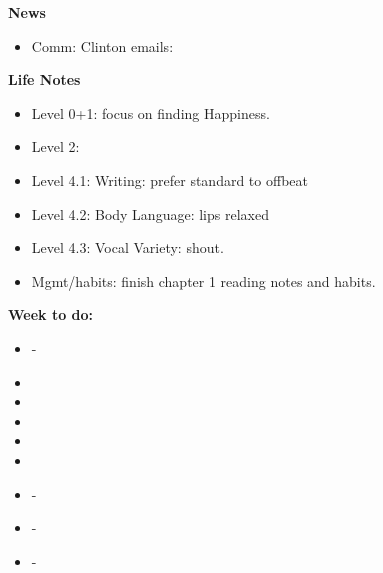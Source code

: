 \documentclass[11pt]{article}
\begin{document}
{            %
            \textbf{News} 
            \begin{itemize}
            \item \tiny Comm: Clinton emails: 
            \end{itemize} 
    
            \textbf{Life Notes}
            \begin{itemize}
              \tiny \item \tiny Level 0+1: focus on finding Happiness.
            \item \tiny Level 2:
            \item \tiny Level 4.1: Writing: prefer standard to offbeat
            \item \tiny Level 4.2: Body Language: lips relaxed
            \item \tiny Level 4.3: Vocal Variety: shout.
            \item \tiny Mgmt/habits: finish chapter 1 reading notes and habits.
            \end{itemize} 
            \newpage
            \textbf{Week to do:} 
            \begin{itemize}
              \small \item \small - 
            \item \small
            \item \small
            \item \small
            \item \small
            \item \small
            \item \small - 
            \item \small - 
            \item \small - 
            \end{itemize} 
            \newpage 
         
}
\end{document}
